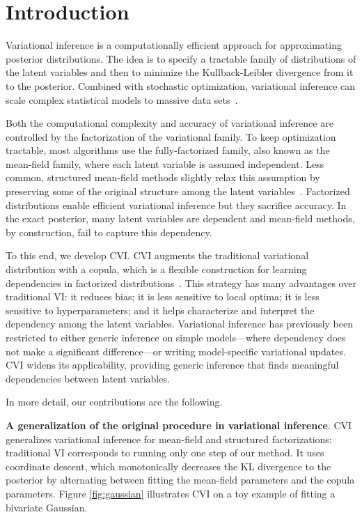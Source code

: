 \section{Introduction}
\label{sec:introduction}


Variational inference is a computationally efficient approach for
approximating posterior distributions. The idea is to specify a
tractable family of distributions of the latent variables and then to
minimize the Kullback-Leibler divergence  from it to the posterior. Combined
with stochastic optimization, variational inference can scale complex
statistical models to massive data sets~\citep{hoffman2013stochastic,toulis2014implicit,tran2015stochastic}.

Both the computational complexity and accuracy of variational
inference are controlled by the factorization of the variational
family. To keep optimization tractable, most algorithms use the
fully-factorized family, also known as the mean-field family, where each
latent variable is assumed independent. Less common, structured
mean-field methods slightly relax this assumption by preserving some
of the original structure among the latent
variables~\citep{saul1995exploiting}. Factorized distributions enable
efficient variational inference but they sacrifice accuracy. In the
exact posterior, many latent variables are dependent and mean-field
methods, by construction, fail to capture this dependency.


To this end, we develop \gls{CVI}.
\Gls{CVI} augments the traditional variational distribution with a
copula, which is a flexible construction for learning dependencies in
factorized distributions~\citep{frechet1960tableaux}.  This strategy has many advantages over
traditional \gls{VI}: it reduces bias; it is less sensitive to local optima;
it is less sensitive to hyperparameters; and it helps characterize and
interpret the dependency among the latent variables.  Variational
inference has previously been restricted to either generic inference
on simple models---where dependency does not make a significant
difference---or writing model-specific variational updates. \Gls{CVI}
widens its applicability, providing generic inference that finds
meaningful dependencies between latent variables.


In more detail, our contributions are the following.

\textbf{A generalization of the original procedure in variational
  inference}. \Gls{CVI} generalizes variational inference for
mean-field and structured factorizations: traditional
\gls{VI} corresponds
to running only one step of our method. It uses coordinate descent,
which monotonically decreases the KL divergence to the posterior by
alternating between fitting the mean-field parameters and the copula
parameters. Figure \ref{fig:gaussian} illustrates \gls{CVI} on a toy
example of fitting a bivariate Gaussian.

